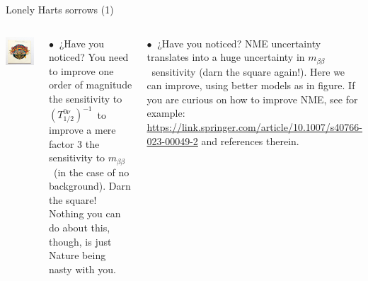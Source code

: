 \documentclass [aspectratio=169]{beamer}
\newcommand{\mbb}{\ensuremath{m_{\beta\beta}}}
\newcommand{\tonu}{\ensuremath{(T_{1/2}^{0\nu})^{-1}}}
\begin{document}
\begin{frame}{Lonely Harts sorrows (1)}
\begin{columns}
\includegraphics[scale=0.35]{lonelyhearts.png}

$\bullet~$ ¿Have you noticed? You need to improve one order of magnitude the sensitivity to \tonu\ to improve a mere factor 3 the sensitivity to \mbb\ (in the case of no background). Darn the square! Nothing you can do about this, though, is just Nature being nasty with you. 

$\bullet~$ ¿Have you noticed? NME uncertainty translates into a huge uncertainty in \mbb\ sensitivity (darn the square again!). Here we can improve, using better models as in figure. If you are curious on how to improve NME, see for example: \url{https://link.springer.com/article/10.1007/s40766-023-00049-2} and references therein.  

\end{columns}
\end{frame}

\end{document}
